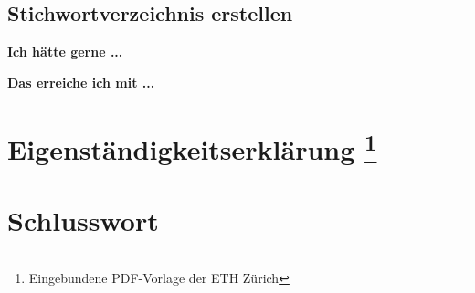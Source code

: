 \documentclass[twoside, 
               a4paper, 
               10pt, 
               parskip=full, 
               sectionentrydots=true, 
               listof=totoc, 
               listof=entryprefix,
               numbers=endperiod]{scrartcl}
\begin{document}
\newpage
\subsection{Stichwortverzeichnis erstellen}
{\textbf {Ich hätte gerne ...}}
 
\begin{miniSeite}[colbacktitle=black!35!white,title=Ausdruck]

\end{miniSeite}


\newpage
{\textbf {Das erreiche ich mit ...}}
 
\begin{miniSeite}[colbacktitle=black!35!white,title=\LaTeX-Code]

\end{miniSeite}




\newpage
\thispagestyle{empty}
\mbox{}

\newpage
{}
\renewcommand{\indexname}{Stichwortverzeichnis \bigskip}\label{index}
\printindex




\newpage
\thispagestyle{empty}
\mbox{}

\newpage
{}
\section*{Eigenständigkeitserklärung
\footnote{Eingebundene PDF-Vorlage der ETH Zürich} 
\label{eigenstaendigkeitserklaerung}}
\begin{figure}

\end{figure}




\newpage
\thispagestyle{empty}
\mbox{}

\newpage
{}
\section*{Schlusswort}

\end{document}
